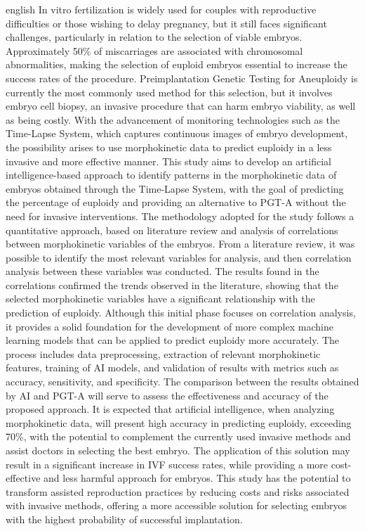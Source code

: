 \begin{resumo}[Abstract]
 \begin{otherlanguage*}{english}
  In vitro fertilization is widely used for couples with reproductive difficulties or those wishing to delay pregnancy, but it still faces significant challenges, particularly in relation to the selection of viable embryos. Approximately 50\% of miscarriages are associated with chromosomal abnormalities, making the selection of euploid embryos essential to increase the success rates of the procedure. Preimplantation Genetic Testing for Aneuploidy is currently the most commonly used method for this selection, but it involves embryo cell biopsy, an invasive procedure that can harm embryo viability, as well as being costly. With the advancement of monitoring technologies such as the Time-Lapse System, which captures continuous images of embryo development, the possibility arises to use morphokinetic data to predict euploidy in a less invasive and more effective manner. This study aims to develop an artificial intelligence-based approach to identify patterns in the morphokinetic data of embryos obtained through the Time-Lapse System, with the goal of predicting the percentage of euploidy and providing an alternative to PGT-A without the need for invasive interventions. The methodology adopted for the study follows a quantitative approach, based on literature review and analysis of correlations between morphokinetic variables of the embryos. From a literature review, it was possible to identify the most relevant variables for analysis, and then correlation analysis between these variables was conducted. The results found in the correlations confirmed the trends observed in the literature, showing that the selected morphokinetic variables have a significant relationship with the prediction of euploidy. Although this initial phase focuses on correlation analysis, it provides a solid foundation for the development of more complex machine learning models that can be applied to predict euploidy more accurately. The process includes data preprocessing, extraction of relevant morphokinetic features, training of AI models, and validation of results with metrics such as accuracy, sensitivity, and specificity. The comparison between the results obtained by AI and PGT-A will serve to assess the effectiveness and accuracy of the proposed approach. It is expected that artificial intelligence, when analyzing morphokinetic data, will present high accuracy in predicting euploidy, exceeding 70\%, with the potential to complement the currently used invasive methods and assist doctors in selecting the best embryo. The application of this solution may result in a significant increase in IVF success rates, while providing a more cost-effective and less harmful approach for embryos. This study has the potential to transform assisted reproduction practices by reducing costs and risks associated with invasive methods, offering a more accessible solution for selecting embryos with the highest probability of successful implantation.


\end{otherlanguage*}
\end{resumo}
